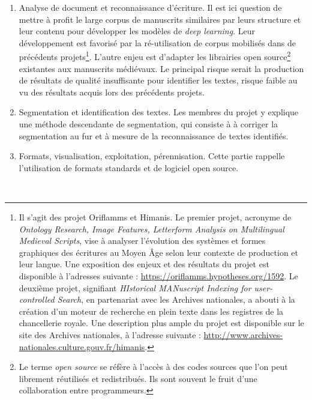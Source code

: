 \documentclass[a4paper,12pt,twoside]{book}
\begin{document}
\begin{enumerate}
	    \item \og Analyse de document et reconnaissance d'écriture\fg{}. Il est ici question de mettre à profit le large corpus de manuscrits similaires par leurs structure et leur contenu pour développer les modèles de \textit{deep learning}. Leur développement est favorisé par la ré-utilisation de corpus mobilisés dans de précédents projets\footnote{Il s'agit des projet Oriflamms et Himanis. Le premier projet, acronyme de \textit{Ontology Research, Image Features, Letterform Analysis on Multilingual Medieval Scripts}, vise à analyser l'évolution des systèmes et formes graphiques des écritures au Moyen Âge selon leur contexte de production et leur langue. Une exposition des enjeux et des résultats du projet est disponible à l'adresses suivante : \url{https://oriflamms.hypotheses.org/1592}. Le deuxième projet, signifiant \textit{HIstorical MANuscript Indexing for user-controlled Search}, en partenariat avec les Archives nationales, a abouti à la création d'un moteur de recherche en plein texte dans les registres de la chancellerie royale. Une description plus ample du projet est disponible sur le site des Archives nationales, à l'adresse suivante : \url{http://www.archives-nationales.culture.gouv.fr/himanis}.}. L'autre enjeu est d'adapter les librairies open source\footnote{Le terme \textit{open source} se réfère à l'accès à des codes sources que l'on peut librement réutilisés et redistribués. Ils sont souvent le fruit d'une collaboration entre programmeurs.} existantes aux manuscrits médiévaux. Le principal risque serait la production de résultats de qualité insuffisante pour identifier les textes, risque faible au vu des résultats acquis lors des précédents projets. 
	   \item \og Segmentation et identification des textes\fg{}. Les membres du projet y explique une méthode descendante de segmentation, qui consiste à à corriger la segmentation au fur et à  mesure de la reconnaissance de textes identifiés. 
	   \item \og Formats, visualisation, exploitation, pérennisation\fg{}. Cette partie rappelle l'utilisation de formats standards et de logiciel open source. 
	\end{enumerate}\\
	
\end{document}
